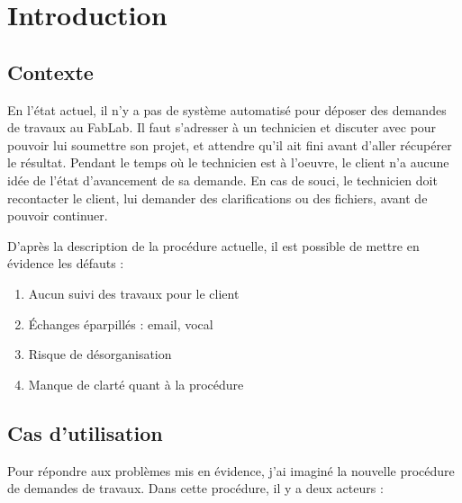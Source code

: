 \documentclass[
    iai, %
    eai, %
]{heig-tb}
\begin{document}
\maketitle
\frontmatter
\clearemptydoublepage

\preamble
\authentification

\begin{abstract}
  
\end{abstract}

\clearemptydoublepage
{
  \tableofcontents
  \let\cleardoublepage\clearpage
  \listoffigures
  \let\cleardoublepage\clearpage
  \listoftables
  \let\cleardoublepage\clearpage
}

\printnomenclature
\clearemptydoublepage
{}


\mainmatter
\chapter{Introduction}
\section{Contexte}
En l'état actuel, il n'y a pas de système automatisé pour déposer des demandes de travaux au FabLab. Il faut s'adresser à un technicien et discuter avec pour pouvoir lui soumettre son projet, et attendre qu'il ait fini avant d'aller récupérer le résultat. Pendant le temps où le technicien est à l'oeuvre, le client n'a aucune idée de l'état d'avancement de sa demande. En cas de souci, le technicien doit recontacter le client, lui demander des clarifications ou des fichiers, avant de pouvoir continuer.

D'après la description de la procédure actuelle, il est possible de mettre en évidence les défauts :

\begin{enumerate}
  \item Aucun suivi des travaux pour le client
  \item Échanges éparpillés : email, vocal
  \item Risque de désorganisation
  \item Manque de clarté quant à la procédure
\end{enumerate}

\section{Cas d'utilisation}
Pour répondre aux problèmes mis en évidence, j'ai imaginé la nouvelle procédure de demandes de travaux. Dans cette procédure, il y a deux acteurs :
\end{document}
